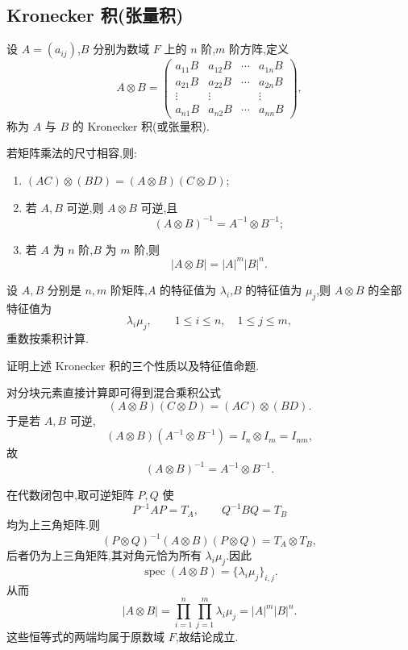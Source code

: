\subsection{Kronecker 积(张量积)}

\begin{definition}
设 $A=(a_{ij})$,$B$ 分别为数域 $F$ 上的 $n$ 阶,$m$ 阶方阵,定义
\[
A\otimes B
=
\begin{pmatrix}
a_{11}B&a_{12}B&\cdots&a_{1n}B\\
a_{21}B&a_{22}B&\cdots&a_{2n}B\\
\vdots&\vdots&&\vdots\\
a_{n1}B&a_{n2}B&\cdots&a_{nn}B
\end{pmatrix},
\]
称为 $A$ 与 $B$ 的 Kronecker 积(或张量积).
\end{definition}

\begin{theorem}[\markstar]
若矩阵乘法的尺寸相容,则:
\begin{enumerate}
  \item $(AC)\otimes(BD)=(A\otimes B)(C\otimes D)$;
  \item 若 $A,B$ 可逆,则 $A\otimes B$ 可逆,且
  \[
  (A\otimes B)^{-1}=A^{-1}\otimes B^{-1};
  \]
  \item 若 $A$ 为 $n$ 阶,$B$ 为 $m$ 阶,则
  \[
  |A\otimes B|=|A|^m|B|^n.
  \]
\end{enumerate}
\end{theorem}

\begin{proposition}[\markstar]
设 $A,B$ 分别是 $n,m$ 阶矩阵,$A$ 的特征值为 $\lambda_i$,$B$ 的特征值为 $\mu_j$,则 $A\otimes B$ 的全部特征值为
\[
\lambda_i\mu_j,
\qquad
1\leq i\leq n,
\quad
1\leq j\leq m,
\]
重数按乘积计算.
\end{proposition}

\begin{example}
证明上述 Kronecker 积的三个性质以及特征值命题.
\end{example}
\exampleblank

\begin{solution}
对分块元素直接计算即可得到混合乘积公式
\[
(A\otimes B)(C\otimes D)=(AC)\otimes(BD).
\]
于是若 $A,B$ 可逆,
\[
(A\otimes B)(A^{-1}\otimes B^{-1})=I_n\otimes I_m=I_{nm},
\]
故
\[
(A\otimes B)^{-1}=A^{-1}\otimes B^{-1}.
\]

在代数闭包中,取可逆矩阵 $P,Q$ 使
\[
P^{-1}AP=T_A,
\qquad
Q^{-1}BQ=T_B
\]
均为上三角矩阵.则
\[
(P\otimes Q)^{-1}(A\otimes B)(P\otimes Q)
=T_A\otimes T_B,
\]
后者仍为上三角矩阵,其对角元恰为所有 $\lambda_i\mu_j$.因此
\[
\operatorname{spec}(A\otimes B)
=
\{\lambda_i\mu_j\}_{i,j}.
\]
从而
\[
|A\otimes B|
=
\prod_{i=1}^{n}\prod_{j=1}^{m}\lambda_i\mu_j
=|A|^m|B|^n.
\]
这些恒等式的两端均属于原数域 $F$,故结论成立.
\end{solution}


